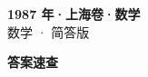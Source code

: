 \documentclass[zihao=-4, a4paper]{ctexart}
\begin{document}
\begin{center}
  {\Large\bfseries 1987 年·上海卷·数学}\\[4pt]
  {\large 数学 · 简答版}
\end{center}
\medskip
{}

\clearpage
{}
\begin{center}{\Large\bfseries 答案速查}\end{center}
\medskip

\end{document}
